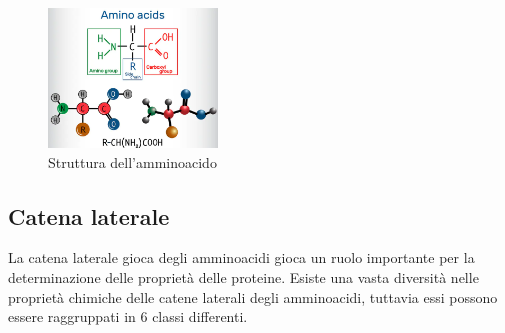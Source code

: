 \begin{figure}
    \centering
    \includegraphics[width=0.4\textwidth]{Immagini/StrutturaAmminoacido.png}
    \caption{Struttura dell'amminoacido}
    \label{fig:AmminoacidoStruttura}
\end{figure}
\subsection{Catena laterale}\label{subsec:Catena_laterale}
La catena laterale gioca degli amminoacidi gioca un ruolo importante per la determinazione delle proprietà delle proteine. Esiste una vasta diversità nelle proprietà 
chimiche delle catene laterali degli amminoacidi, tuttavia essi possono essere raggruppati in 6 classi differenti.

\begin{table}[ht]
    \centering
    \vspace*{2mm}
	\caption{Classi di amminoacidi}
	\label{tab:tabellaclassiamminoacido}    
\end{table}

